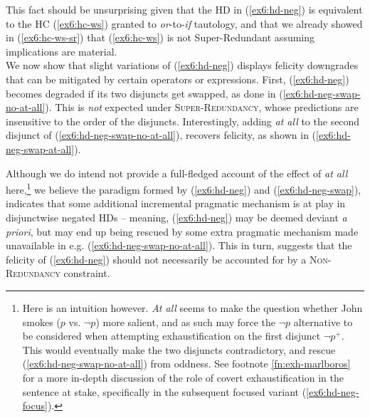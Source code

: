 This fact should be unsurprising given that the HD in (\ref{ex6:hd-neg}) is equivalent to the HC (\ref{ex6:hc-ws}) granted to \textit{or}-to-\textit{if} tautology, and that we already showed in (\ref{ex6:hc-ws-sr}) that (\ref{ex6:hc-ws}) is not Super-Redundant assuming implications are material.\\

We now show that slight variations of (\ref{ex6:hd-neg}) displays felicity downgrades that can be mitigated by certain operators or expressions. First, (\ref{ex6:hd-neg}) becomes degraded if its two disjuncts get swapped, as done in (\ref{ex6:hd-neg-swap-no-at-all}). This is \textit{not} expected under \textsc{Super-Redundancy}, whose predictions are insensitive to the order of the disjuncts. Interestingly, adding \textit{at all} to the second disjunct of (\ref{ex6:hd-neg-swap-no-at-all}), recovers felicity, as shown in (\ref{ex6:hd-neg-swap-at-all}). 

\begin{exe}
	\ex \label{ex6:hd-neg-swap}
	\begin{xlist}
		\label{ex6:hd-neg-swap-no-at-all}
		\label{ex6:hd-neg-swap-at-all}
	\end{xlist}
\end{exe}

Although we do intend not provide a full-fledged account of the effect of \textit{at all} here,\footnote{Here is an intuition however. \textit{At all} seems to make the question whether John smokes ($p$ vs. $\neg p$) more salient, and as such may force the $\neg p$ alternative to be considered when attempting exhaustification on the first disjunct $\neg p^+$. This would eventually make the two disjuncts contradictory, and rescue (\ref{ex6:hd-neg-swap-no-at-all}) from oddness. See footnote \ref{fn:exh-marlboros} for a more in-depth discussion of the role of covert exhaustification in the sentence at stake, specifically in the subsequent focused variant (\ref{ex6:hd-neg-focus}).}
we believe the paradigm formed by (\ref{ex6:hd-neg}) and (\ref{ex6:hd-neg-swap}), indicates that some additional incremental pragmatic mechanism is at play in disjunctwise negated HDs -- meaning, (\ref{ex6:hd-neg}) may be deemed deviant \textit{a priori}, but may end up being rescued by some extra pragmatic mechanism made unavailable in e.g. (\ref{ex6:hd-neg-swap-no-at-all}). This in turn, suggests that the felicity of (\ref{ex6:hd-neg}) should not necessarily be accounted for by a \textsc{Non-Redundancy} constraint.

